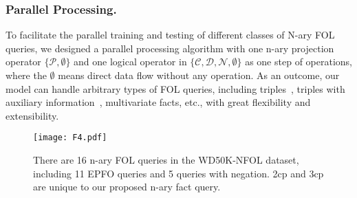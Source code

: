 \documentclass[letterpaper]{article} \usepackage{aaai23}  \usepackage{times}  \usepackage{helvet}  \usepackage{courier}  \usepackage[hyphens]{url}  \usepackage{graphicx} \urlstyle{rm} \def\UrlFont{\rm}  \usepackage{natbib}  \usepackage{caption} \frenchspacing  \setlength{\pdfpagewidth}{8.5in}  \setlength{\pdfpageheight}{11in}  \usepackage{algorithm}
\begin{document}
\subsubsection{Parallel Processing.}
To facilitate the parallel training and testing of different classes of N-ary FOL queries, we designed a parallel processing algorithm with one n-ary projection operator $\{\mathcal{P},\emptyset\}$ and one logical operator in $\{\mathcal{C},\mathcal{D},\mathcal{N},\emptyset\}$ as one step of operations, where the $\emptyset$ means direct data flow without any operation. As an outcome, our model can handle arbitrary types of FOL queries, including triples~\citep{BetaE}, triples with auxiliary information~\citep{StarQE}, multivariate facts, etc., with great flexibility and extensibility.




\begin{figure*}[t]
\centering
\texttt{[image: F4.pdf]}
\caption{There are 16 n-ary FOL queries in the WD50K-NFOL dataset, including 11 EPFO queries and 5 queries with negation. 2cp and 3cp are unique to our proposed n-ary fact query.}
\label{f4}
\end{figure*}
\end{document}
